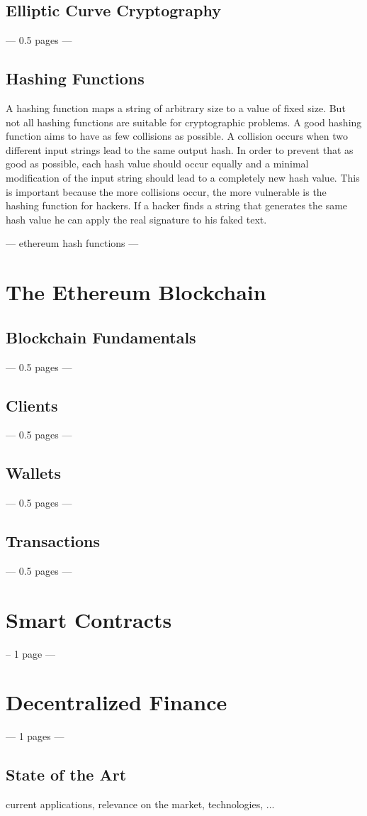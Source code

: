 \subsection{Elliptic Curve Cryptography}
--- 0.5 pages ---
\subsection{Hashing Functions}
A hashing function maps a string of arbitrary size to a value of fixed size. But not all hashing functions are suitable for cryptographic problems. A good hashing function aims to have as few collisions as possible. A collision occurs when two different input strings lead to the same output hash. In order to prevent that as good as possible, each hash value should occur equally and a minimal modification of the input string should lead to a completely new hash value. This is important because the more collisions occur, the more vulnerable is the hashing function for hackers. If a hacker finds a string that generates the same hash value he can apply the real signature to his faked text.

--- ethereum hash functions --- 

\section{The Ethereum Blockchain}
\subsection{Blockchain Fundamentals}
--- 0.5 pages ---
\subsection{Clients}
--- 0.5 pages ---
\subsection{Wallets}
--- 0.5 pages ---
\subsection{Transactions}
--- 0.5 pages ---
\section{Smart Contracts}
-- 1 page ---
\section{Decentralized Finance}
--- 1 pages ---
\subsection{State of the Art}
current applications, relevance on the market, technologies, ...